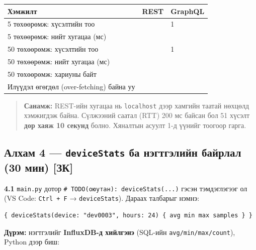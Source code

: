 \begingroup\scriptsize\begin{longtable}[]{@{}lll@{}}
\toprule
Хэмжилт & REST & GraphQL\tabularnewline
\midrule
\endhead
5 төхөөрөмж: хүсэлтийн тоо & & 1\tabularnewline
5 төхөөрөмж: нийт хугацаа (мс) & &\tabularnewline
50 төхөөрөмж: хүсэлтийн тоо & & 1\tabularnewline
50 төхөөрөмж: нийт хугацаа (мс) & &\tabularnewline
50 төхөөрөмж: хариуны байт & &\tabularnewline
Илүүдэл өгөгдөл (over-fetching) байна уу & &\tabularnewline
\bottomrule
\end{longtable}\endgroup

\begin{quote}
\textbf{Санамж:} REST-ийн хугацаа нь \texttt{localhost} дээр хамгийн таатай нөхцөлд хэмжигдэж байна. Сүлжээний саатал (RTT) 200 мс байсан бол 51 хүсэлт \textbf{дор хаяж 10 секунд} болно. Хяналтын асуулт 1-д үүнийг тоогоор гарга.
\end{quote}

\hypertarget{ux430ux43bux445ux430ux43c-4-devicestats-ux431ux430-ux43dux44dux433ux442ux433ux44dux43bux438ux439ux43d-ux431ux430ux439ux440ux43bux430ux43b-30-ux43cux438ux43d-ux437ux43a}{%
\subsection{\texorpdfstring{Алхам 4 --- \texttt{deviceStats} ба нэгтгэлийн байрлал (30 мин) {[}ЗК{]}}{Алхам 4 --- deviceStats ба нэгтгэлийн байрлал (30 мин) {[}ЗК{]}}}\label{ux430ux43bux445ux430ux43c-4-devicestats-ux431ux430-ux43dux44dux433ux442ux433ux44dux43bux438ux439ux43d-ux431ux430ux439ux440ux43bux430ux43b-30-ux43cux438ux43d-ux437ux43a}}

\textbf{4.1} \texttt{main.py} дотор \texttt{\#\ TODO(оюутан):\allowbreak{}\ deviceStats(.\allowbreak{}.\allowbreak{}.\allowbreak{})} гэсэн тэмдэглэгээг ол (VS Code: \texttt{Ctrl\ +\ F} → \texttt{deviceStats}). Дараах талбарыг нэмнэ:

\begin{verbatim}
{ deviceStats(device: "dev0003", hours: 24) { avg min max samples } }
\end{verbatim}

\textbf{Дүрэм:} нэгтгэлийг \textbf{InfluxDB-д хийлгэнэ} (SQL-ийн \texttt{avg/\allowbreak{}min/\allowbreak{}max/\allowbreak{}count}), Python дээр биш:

\begin{Shaded}
\begin{Highlighting}[]
  \NormalTok{, } \NormalTok{, } \NormalTok{,}
\OperatorTok{=}    \OperatorTok{\textgreater{}}\OperatorTok{{-}}  
\end{Highlighting}
\end{Shaded}

